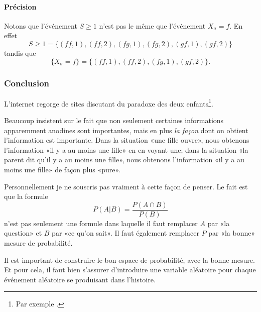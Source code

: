 \paragraph{Précision}
Notons que l'événement \( S\geq 1\) n'est pas le même que l'événement \( X_{\sigma}=f\). En effet
\begin{equation}
    S\geq 1=\{ (ff,1),(ff,2),(fg,1),(fg,2),(gf,1),(gf,2) \}
\end{equation}
tandis que
\begin{equation}
    \{ X_{\sigma}=f \}=\{ (ff,1),(ff,2),(fg,1),(gf,2) \}.
\end{equation}

\subsubsection{Conclusion}

L'internet regorge de sites discutant du paradoxe des deux enfants\footnote{Par exemple \cite{BIBooBXKDooOTEkjy}.}.

Beaucoup insistent sur le fait que non seulement certaines informations apparemment anodines sont importantes, mais en plus \emph{la façon} dont on obtient l'information est importante. Dans la situation «une fille ouvre», nous obtenons l'information «il y a au moins une fille» en en voyant une; dans la situation «la parent dit qu'il y a au moins une fille», nous obtenons l'information «il y a au moins une fille» de façon plus «pure».

Personnellement je ne souscris pas vraiment à cette façon de penser. Le fait est que la formule
\begin{equation}
    P(A|B)=\frac{ P(A\cap B) }{ P(B) }
\end{equation}
n'est pas seulement une formule dans laquelle il faut remplacer \( A\) par «la question» et \( B\) par «ce qu'on sait». Il faut également remplacer \( P\) par «la bonne» mesure de probabilité.

Il est important de construire le bon espace de probabilité, avec la bonne mesure. Et pour cela, il faut bien s'assurer d'introduire une variable aléatoire pour chaque événement aléatoire se produisant dans l'histoire.

